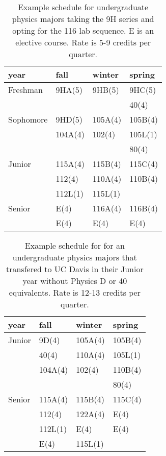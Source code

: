 \documentclass[12pt]{article}
\begin{document}
\begin{table}
\caption{Example schedule for undergraduate physics majors taking the 9H series and opting for the 116 lab sequence.  E is an elective course.  Rate is 5-9 credits per quarter.}
\label{tbl:proposed-honors}
\begin{center}
\begin{tabular}{|l|l|l|l|}
\hline
year      & fall    & winter & spring \\
\hline
Freshman  & 9HA(5)  & 9HB(5)  & 9HC(5) \\
          &         &         & 40(4)  \\
\hline
Sophomore & 9HD(5)  & 105A(4) &  105B(4) \\
          & 104A(4) & 102(4)  &  105L(1) \\
          &         &         &  80(4)\\
\hline
Junior    & 115A(4) & 115B(4)  & 115C(4)\\
          & 112(4)  & 110A(4)  & 110B(4)\\
		  & 112L(1) & 115L(1)  & \\
\hline
Senior    & E(4)    & 116A(4)  & 116B(4) \\
          & E(4)    & E(4)     & E(4) \\

\hline  
\end{tabular}
\end{center}
\end{table}

\begin{table}

\caption{Example schedule for for an undergraduate physics majors that transfered to UC Davis in their Junior year without Physics D or 40 equivalents.  Rate is 12-13 credits per quarter.}
\label{tbl:proposed-transfers}
\begin{center}
\begin{tabular}{|l|l|l|l|}
\hline
year      & fall    & winter & spring \\
\hline
Junior   & 9D(4)     & 105A(4)       & 105B(4) \\
         & 40(4)     & 110A(4)       & 105L(1) \\         
         & 104A(4)   & 102(4)        & 110B(4) \\
         &           &               & 80(4) \\
\hline
Senior   & 115A(4)   & 115B(4)       & 115C(4) \\
         & 112(4)    & 122A(4)       & E(4) \\
         & 112L(1)   & E(4)          & E(4)  \\
		 & E(4)      & 115L(1)       & \\
\hline 
\end{tabular}
\end{center}
\end{table}
\end{document}
